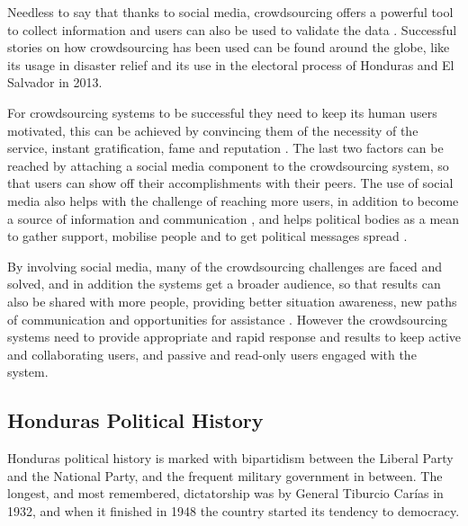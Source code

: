 \documentclass[letterpaper,10pt]{article}
\begin{document}
Needless to say that thanks to social media, crowdsourcing offers a powerful tool to collect information and users can also be used to validate the data \citep{gao2011}. Successful stories on how crowdsourcing has been used can be found around the globe, like its usage in disaster relief \citep{yin2012, gao2011} and its use in the electoral process of Honduras and El Salvador in 2013.

For crowdsourcing systems to be successful they need to keep its human users motivated, this can be achieved by convincing them of the necessity of the service, instant gratification, fame and reputation \citep{doan2011}. The last two factors can be reached by attaching a social media component to the crowdsourcing system, so that users can show off their accomplishments with their peers. The use of social media also helps with the challenge of reaching more users, in addition to become a source of information and communication \citep{yin2012}, and helps political bodies as a mean to gather support, mobilise people and to get political messages spread \citep{map2014}.

By involving social media, many of the crowdsourcing challenges are faced and solved, and in addition the systems get a broader audience, so that results can also be shared with more people, providing better situation awareness, new paths of communication and opportunities for assistance \citep{gao2011}. However the crowdsourcing systems need to provide appropriate and rapid response and results to keep active and collaborating users, and passive and read-only users engaged with the system.


\subsection{Honduras Political History}

Honduras political history is marked with bipartidism between the Liberal Party and the National Party, and the frequent military government in between. The longest, and most remembered, dictatorship was by General Tiburcio Carías in 1932, and when it finished in 1948 the country started its tendency to democracy.
\end{document}
